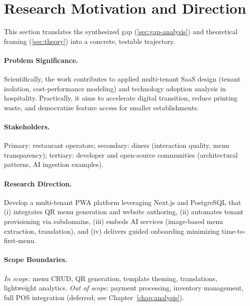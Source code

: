 \section{Research Motivation and Direction}\label{sec:motivation}
This section translates the synthesized gap (\cref{sec:gap-analysis}) and theoretical framing (\cref{sec:theory}) into a concrete, testable trajectory.

\paragraph{Problem Significance.} Scientifically, the work contributes to applied multi-tenant SaaS design (tenant isolation, cost-performance modeling) and technology adoption analysis in hospitality. Practically, it aims to accelerate digital transition, reduce printing waste, and democratize feature access for smaller establishments.

\paragraph{Stakeholders.} Primary: restaurant operators; secondary: diners (interaction quality, menu transparency); tertiary: developer and open-source communities (architectural patterns, AI ingestion examples).

\paragraph{Research Direction.} Develop a multi-tenant PWA platform leveraging Next.js and PostgreSQL that (i) integrates QR menu generation and website authoring, (ii) automates tenant provisioning via subdomains, (iii) embeds AI services (image-based menu extraction, translation), and (iv) delivers guided onboarding minimizing time-to-first-menu.

\paragraph{Scope Boundaries.} \emph{In scope:} menu CRUD, QR generation, template theming, translations, lightweight analytics. \emph{Out of scope:} payment processing, inventory management, full POS integration (deferred; see Chapter~\ref{chap:analysis}).

